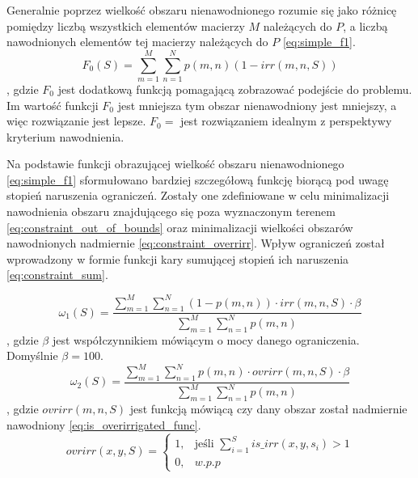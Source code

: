 \documentclass[twoside]{iisthesis}
\begin{document}
Generalnie poprzez wielkość obszaru nienawodnionego rozumie się jako różnicę pomiędzy liczbą wszystkich elementów macierzy $M$ należących do $P$, a liczbą nawodnionych elementów tej macierzy należących do $P$ \eqref{eq:simple_f1}.
\begin{equation}\label{eq:simple_f1}
	F_{0}(S) = \sum_{m=1}^{M}\sum_{n=1}^{N} p(m,n)(1 - irr(m,n,S))
\end{equation}
, gdzie $F_{0}$ jest dodatkową funkcją pomagającą zobrazować podejście do problemu. Im wartość funkcji $F_{0}$ jest mniejsza tym obszar nienawodniony jest mniejszy, a więc rozwiązanie jest lepsze. $F_{0} = $ jest rozwiązaniem idealnym z perspektywy kryterium nawodnienia.


Na podstawie funkcji obrazującej wielkość obszaru nienawodnionego \eqref{eq:simple_f1} sformułowano bardziej szczegółową funkcję biorącą pod uwagę stopień naruszenia ograniczeń. Zostały one zdefiniowane w celu minimalizacji nawodnienia obszaru znajdującego się poza wyznaczonym terenem \eqref{eq:constraint_out_of_bounds} oraz minimalizacji wielkości obszarów nawodnionych nadmiernie \eqref{eq:constraint_overrirr}. Wpływ ograniczeń został wprowadzony w formie funkcji kary sumującej stopień ich naruszenia \eqref{eq:constraint_sum}.

\begin{equation}\label{eq:constraint_out_of_bounds}
	\omega_{1}(S) = \dfrac{\sum_{m=1}^{M}\sum_{n=1}^{N} (1 - p(m,n)) \cdot irr(m,n,S) \cdot \beta}{\sum_{m=1}^{M}\sum_{n=1}^{N} p(m,n)}
\end{equation}
, gdzie $\beta$ jest współczynnikiem mówiącym o mocy danego ograniczenia. Domyślnie $\beta=100$.\\
\begin{equation}\label{eq:constraint_overrirr}
	\omega_{2}(S) = \dfrac{\sum_{m=1}^{M}\sum_{n=1}^{N} p(m,n) \cdot ovrirr(m,n,S) \cdot \beta}{\sum_{m=1}^{M}\sum_{n=1}^{N} p(m,n)}
\end{equation}
, gdzie $ovrirr(m,n,S)$ jest funkcją mówiącą czy dany obszar został nadmiernie nawodniony \eqref{eq:is_overirrigated_func}.\\
\begin{equation}\label{eq:is_overirrigated_func}
	ovrirr(x,y,S) = \begin{cases}
				1,& \text{jeśli } \sum_{i=1}^{S} is\_irr(x,y,s_{i}) > 1 \\
				0,& w.p.p
			   \end{cases}
\end{equation}
\end{document}
